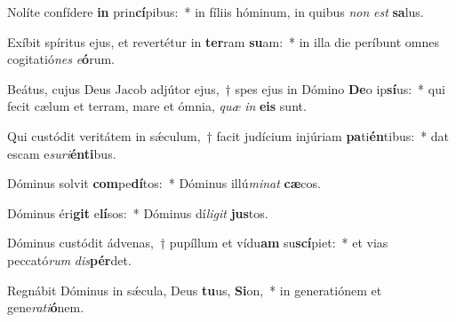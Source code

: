 \item Nolíte confídere \textbf{in} prin\textbf{cí}pibus:~* in fíliis hóminum, in quibus \textit{non} \textit{est} \textbf{sa}lus.
\item Exíbit spíritus ejus, et revertétur in \textbf{ter}ram \textbf{su}am:~* in illa die períbunt omnes cogitatió\textit{nes} \textit{e}\textbf{ó}rum.
\item Beátus, cujus Deus Jacob adjútor ejus,~† spes ejus in Dómino \textbf{De}o ip\textbf{sí}us:~* qui fecit cælum et terram, mare et ómnia, \textit{quæ} \textit{in} \textbf{e}\textbf{is} sunt.
\item Qui custódit veritátem in sǽculum,~† facit judícium injúriam \textbf{pa}ti\textbf{én}tibus:~* dat escam e\textit{su}\textit{ri}\textbf{én}\textbf{ti}bus.
\item Dóminus solvit \textbf{com}pe\textbf{dí}tos:~* Dóminus illú\textit{mi}\textit{nat} \textbf{cæ}cos.
\item Dóminus éri\textbf{git} e\textbf{lí}sos:~* Dóminus dí\textit{li}\textit{git} \textbf{jus}tos.
\item Dóminus custódit ádvenas,~† pupíllum et vídu\textbf{am} su\textbf{scí}piet:~* et vias peccató\textit{rum} \textit{dis}\textbf{pér}det.
\item Regnábit Dóminus in sǽcula, Deus \textbf{tu}us, \textbf{Si}on,~* in generatiónem et gene\textit{ra}\textit{ti}\textbf{ó}nem.
